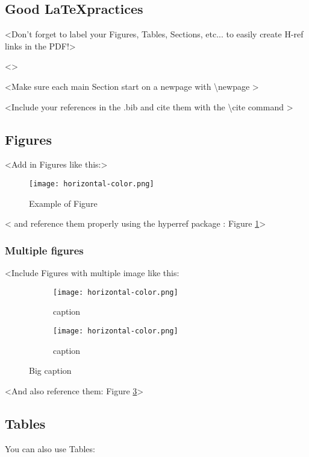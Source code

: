 
\subsection{Good \LaTeX  practices}
\label{subsec:practices}
<Don't forget to label your Figures, Tables, Sections, etc... to easily create H-ref links in the PDF!>

<>

<Make sure each main Section start on a newpage with \textbackslash newpage >

<Include your references in the .bib and cite them with the  \textbackslash cite command \cite{goodfellow2014generative} >
\newpage
\subsection{Figures}
\label{subsec:figures}

<Add in Figures like this:>
\begin{figure}[H]
  \centering
  \texttt{[image: horizontal-color.png]}
  \caption{Example of Figure}
  \vspace{-3mm}
  \label{fig:fig_example}
\end{figure}
< and reference them properly using the hyperref package : Figure \ref{fig:fig_example}>

\subsubsection{Multiple figures}
\label{subsub:multiple}
<Include Figures with multiple image like this: 
\begin{figure}[H]
\centering
  \begin{subfigure}[t]{0.45\textwidth}
    \texttt{[image: horizontal-color.png]}  
    \caption{ caption}
    \label{subfig:sub1}
  \end{subfigure}
  \hfill
  \begin{subfigure}[t]{0.45\textwidth}
    \texttt{[image: horizontal-color.png]} 
    \caption{ caption}
    \label{subfig:sub2}
  \end{subfigure}
\caption{Big caption}    
\label{fig:multifigs}
\end{figure}  

<And also reference them: Figure \ref{subfig:sub2}>

\subsection{Tables}
\label{subsec:tables}
You can also use Tables:


